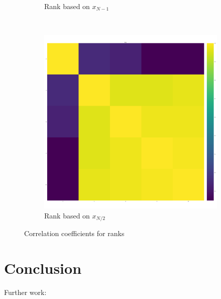 \documentclass{article}
\begin{document}
\begin{figure}[!htbp]
\begin{subfigure}[t]{.3\textwidth}
        \caption{Rank based on \(x_{N - 1}\)}
    \end{subfigure}
    ~
	\begin{subfigure}[t]{.3\textwidth}
		\centering
		\includegraphics[width=.9\textwidth]{../img/correlation_heatmap_coexist.pdf}
        \caption{Rank based on \(x_{N/2}\)}
    \end{subfigure}
    \caption{Correlation coefficients for ranks}
    \label{fig:correlation_coefficients}
\end{figure}






\section{Conclusion}\label{sec:conclusion}


Further work:
\end{document}
